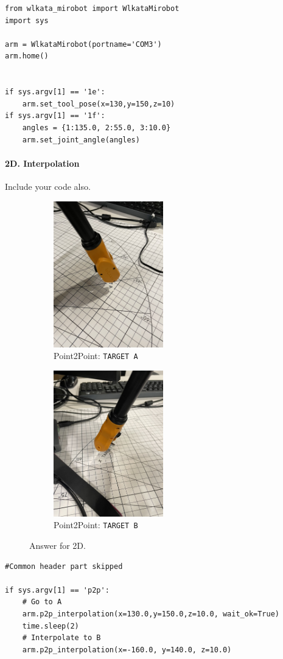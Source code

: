 \begin{verbatim}
from wlkata_mirobot import WlkataMirobot
import sys

arm = WlkataMirobot(portname='COM3')
arm.home()


if sys.argv[1] == '1e':
    arm.set_tool_pose(x=130,y=150,z=10)
if sys.argv[1] == '1f':
    angles = {1:135.0, 2:55.0, 3:10.0}
    arm.set_joint_angle(angles)
\end{verbatim}

\newpage
\paragraph{2D. Interpolation}
Include your code also.

\begin{figure}[hb!]
     \centering
    \begin{subfigure}[b]{0.3\textwidth}
        \includegraphics[height=2.5in]{image/2d_p2p.jpg}
         \caption*{Point2Point: \texttt{TARGET A}}
     \end{subfigure}
     \hfill
     \begin{subfigure}[b]{0.3\textwidth}
        \includegraphics[height=2.5in]{image/2d_p2p_b.jpg}
         \caption*{Point2Point: \texttt{TARGET B}}
     \end{subfigure}
    \caption*{Answer for 2D.}
\end{figure}
%
\begin{verbatim}
#Common header part skipped

if sys.argv[1] == 'p2p':
    # Go to A
    arm.p2p_interpolation(x=130.0,y=150.0,z=10.0, wait_ok=True)
    time.sleep(2)
    # Interpolate to B
    arm.p2p_interpolation(x=-160.0, y=140.0, z=10.0)
\end{verbatim}

